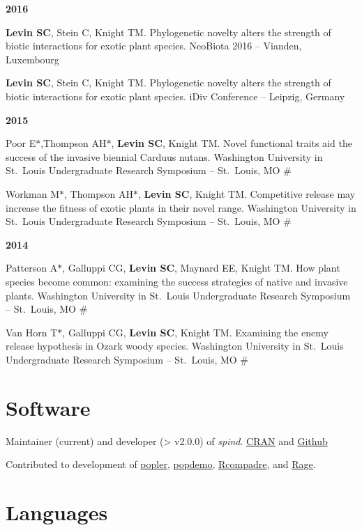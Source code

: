\documentclass[11pt,]{article}
\begin{document}
\textbf{2016}

\textbf{Levin SC}, Stein C, Knight TM. Phylogenetic novelty alters the
strength of biotic interactions for exotic plant species. NeoBiota 2016
-- Vianden, Luxembourg

\textbf{Levin SC}, Stein C, Knight TM. Phylogenetic novelty alters the
strength of biotic interactions for exotic plant species. iDiv
Conference -- Leipzig, Germany

\textbf{2015}

Poor E\(\ast\),Thompson AH\(\ast\), \textbf{Levin SC}, Knight TM. Novel
functional traits aid the success of the invasive biennial Carduus
nutans. Washington University in St.~Louis Undergraduate Research
Symposium -- St.~Louis, MO \#

Workman M\(\ast\), Thompson AH\(\ast\), \textbf{Levin SC}, Knight TM.
Competitive release may increase the fitness of exotic plants in their
novel range. Washington University in St.~Louis Undergraduate Research
Symposium -- St.~Louis, MO \#

\textbf{2014}

Patterson A\(\ast\), Galluppi CG, \textbf{Levin SC}, Maynard EE, Knight
TM. How plant species become common: examining the success strategies of
native and invasive plants. Washington University in St.~Louis
Undergraduate Research Symposium -- St.~Louis, MO \#

Van Horn T\(\ast\), Galluppi CG, \textbf{Levin SC}, Knight TM. Examining
the enemy release hypothesis in Ozark woody species. Washington
University in St.~Louis Undergraduate Research Symposium -- St.~Louis,
MO \#

\section{Software}\label{software}

Maintainer (current) and developer (\textgreater{} v2.0.0) of
\emph{spind}.
\href{https://cran.r-project.org/web/checks/check_results_spind.html}{CRAN}
and \href{https://github.com/levisc8/spind}{Github}

Contributed to development of
\href{https://github.com/AldoCompagnoni/popler}{popler},
\href{https://github.com/iainmstott/popdemo}{popdemo},
\href{https://github.com/jonesor/Rcompadre}{Rcompadre}, and
\href{https://github.com/jonesor/Rage}{Rage}.

\section{Languages}\label{languages}
\end{document}
